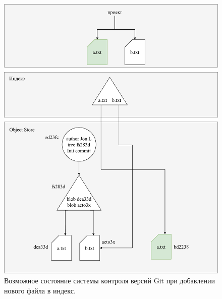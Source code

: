 \begin{figure}[hbtp]
    \centering
    \includegraphics[width=\textwidth]{./img/git-add.pdf}
    \caption{Возможное состояние системы контроля версий Git при добавлении нового файла в индекс.}
    \label{fig:git2}
\end{figure}


